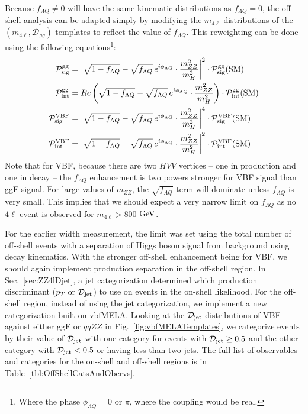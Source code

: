 Because $f_{\Lambda Q}\neq0$ will have the same kinematic distributions as $f_{\Lambda Q}=0$, the off-shell analysis can be adapted simply by modifying the $m_{4\ell}$ distributions of the $(m_{4\ell},\mathcal{D}_{gg})$ templates to reflect the value of $f_{\Lambda Q}$. This reweighting can be done using the following equations\footnote{Where the phase $\phi_{\Lambda Q}=0$ or $\pi$, where the coupling would be real.}:
\begin{align}
{\mathcal P}_{\rm sig}^{\rm gg} &= \left|\sqrt{1-f_{\Lambda Q} } - \sqrt{f_{\Lambda Q}} \,e^{i\phi_{\Lambda Q}} \cdot \frac{m_{ZZ}^2}{m_{H}^2}\right|^2\cdot {\mathcal P}_{\rm sig}^{\rm gg}(\rm SM) \notag \\
{\mathcal P}_{\rm int}^{\rm gg} &= Re \left(\sqrt{1-f_{\Lambda Q} } - \sqrt{f_{\Lambda Q} } \,e^{i\phi_{\Lambda Q}} \cdot \frac{m_{ZZ}^2}{m_{H}^2}\right) \cdot {\mathcal P}_{\rm int}^{\rm gg}(\rm SM) \notag \\
{\mathcal P}_{\rm sig}^{\rm VBF} &= \left|\sqrt{1-f_{\Lambda Q} } - \sqrt{f_{\Lambda Q} } \,e^{i\phi_{\Lambda Q}} \cdot \frac{m_{ZZ}^2}{m_{H}^2}\right|^4\cdot {\mathcal P}_{\rm sig}^{\rm VBF}(\rm SM) \notag \\
{\mathcal P}_{\rm int}^{\rm VBF} &= \left|\sqrt{1-f_{\Lambda Q} } - \sqrt{f_{\Lambda Q} } \,e^{i\phi_{\Lambda Q}} \cdot \frac{m_{ZZ}^2}{m_{H}^2}\right|^2\cdot {\mathcal P}_{\rm int}^{\rm VBF}(\rm SM) \notag
\label{eqn:fLQOffShellFormula} 
\end{align}
Note that for VBF, because there are two $HVV$ vertices -- one in production and one in decay -- the $f_{\Lambda Q}$ enhancement is two powers stronger for VBF signal than ggF signal. For large values of $m_{ZZ}$, the $\sqrt{f_{\Lambda Q}}$ term will dominate unless $f_{\Lambda Q}$ is very small. This implies that we should expect a very narrow limit on $f_{\Lambda Q}$ as no $4\ell$ event is observed for $m_{4\ell} > 800$ $\rm{GeV}$.

For the earlier width measurement, the limit was set using the total number of off-shell events with a separation of Higgs boson signal from background using decay kinematics. With the stronger off-shell enhancement being for VBF, we should again implement production separation in the off-shell region. In Sec.~\ref{sec:ZZ4lDjet}, a jet categorization determined which production discriminant ($p_T \rm{~or~} \mathcal{D}_{\rm jet}$) to use on events in the on-shell likelihood. For the off-shell region, instead of using the jet categorization, we implement a new categorization built on vbfMELA. Looking at the $\mathcal{D}_{\rm jet}$ distributions of VBF against either ggF or $q\bar{q}ZZ$ in Fig.~\ref{fig:vbfMELATemplates}, we categorize events by their value of $\mathcal{D}_{\rm jet}$ with one category for events with $\mathcal{D}_{\rm jet}\geq0.5$ and the other category with $\mathcal{D}_{\rm jet}<0.5$ or having less than two jets. The full list of observables and categories for the on-shell and off-shell regions is in Table~\ref{tbl:OffShellCatsAndObervs}.

